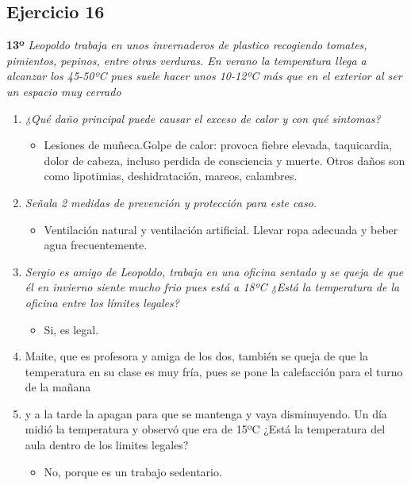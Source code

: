 \documentclass{article}
\begin{document}
      \subsection{Ejercicio 16}
        \textbf{13º} \textit{Leopoldo trabaja en unos invernaderos de plastico recogiendo tomates, pimientos, pepinos, entre otras verduras. En verano la temperatura llega 
        a alcanzar los 45-50ºC pues suele hacer unos 10-12ºC más que en el exterior al ser un espacio muy cerrado}
        \begin{enumerate}[label=(\alph*)]
          \item \textit{¿Qué daño principal puede causar el exceso de calor y con qué sintomas?}
            \begin{itemize}
              \item Lesiones de muñeca.Golpe de calor: provoca fiebre elevada, taquicardia, dolor de cabeza, incluso perdida de consciencia y muerte. Otros daños son como 
              lipotimias, deshidratación, mareos, calambres.
            \end{itemize}
          \item \textit{Señala 2 medidas de prevención y protección para este caso.}
            \begin{itemize}
              \item Ventilación natural y ventilación artificial. Llevar ropa adecuada y beber agua frecuentemente.
            \end{itemize}
          \item \textit{Sergio es amigo de Leopoldo, trabaja en una oficina sentado y se queja de que él en invierno siente mucho frio pues está a 18ºC ¿Está la temperatura 
          de la oficina entre los límites legales?}
            \begin{itemize}
              \item Si, es legal.
            \end{itemize}
          \item Maite, que es profesora y amiga de los dos, también se queja de que la temperatura en su clase es muy fría, pues se pone la calefacción para el turno de la mañana 
          \item y a la tarde la apagan para que se mantenga y vaya disminuyendo. Un día midió la temperatura y observó que era de 15ºC ¿Está la temperatura del aula 
          dentro de los limites legales?
            \begin{itemize}
              \item No, porque es un trabajo sedentario.
            \end{itemize}
        \end{enumerate}
\end{document}
